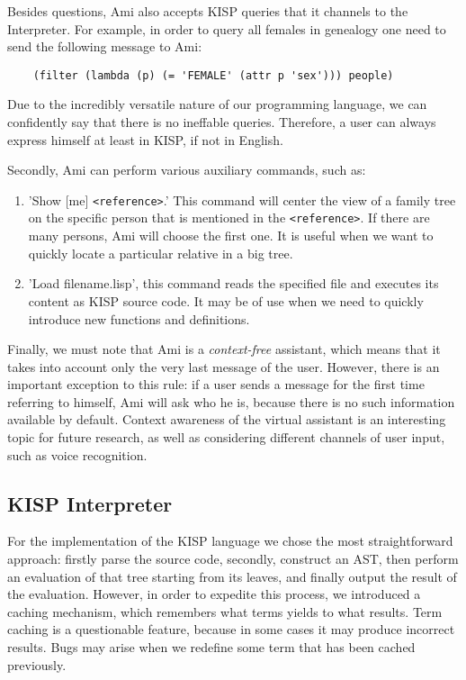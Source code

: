     Besides questions, Ami also accepts KISP queries that it channels to the Interpreter. For example, in order to query
    all females in genealogy one need to send the following message to Ami:
    \begin{verbatim}
    (filter (lambda (p) (= 'FEMALE' (attr p 'sex'))) people)
    \end{verbatim}
    Due to the incredibly versatile nature of our programming language, we can confidently say that there is no ineffable queries.
    Therefore, a user can always express himself at least in KISP, if not in English.

    Secondly, Ami can perform various auxiliary commands, such as:
    \begin{enumerate}
        \item{'Show [me] \texttt{<reference>}.' This command will center the view of a family tree on the specific person that is
            mentioned in the \texttt{<reference>}. If there are many persons, Ami will choose the first one. It is useful when we want
            to quickly locate a particular relative in a big tree.}
        \item{'Load filename.lisp', this command reads the specified file and executes its content as KISP source code. It may be of
            use when we need to quickly introduce new functions and definitions.}
    \end{enumerate}

    Finally, we must note that Ami is a \textit{context-free} assistant, which means that it takes into account only the very last
    message of the user. However, there is an important exception to this rule: if a user sends a message for the first time
    referring to himself, Ami will ask who he is, because there is no such information available by default. Context awareness of the
    virtual assistant is an interesting topic for future research, as well as considering different channels of user input, such as
    voice recognition.

    \subsection{KISP Interpreter}
    For the implementation of the KISP language we chose the most straightforward approach: firstly parse the source code, secondly,
    construct an AST, then perform an evaluation of that tree starting from its leaves, and finally output the result of the
    evaluation. However, in order to expedite this process, we introduced a caching mechanism, which remembers what terms yields to
    what results. Term caching is a questionable feature, because in some cases it may produce incorrect results. Bugs may arise when
    we redefine some term that has been cached previously.

